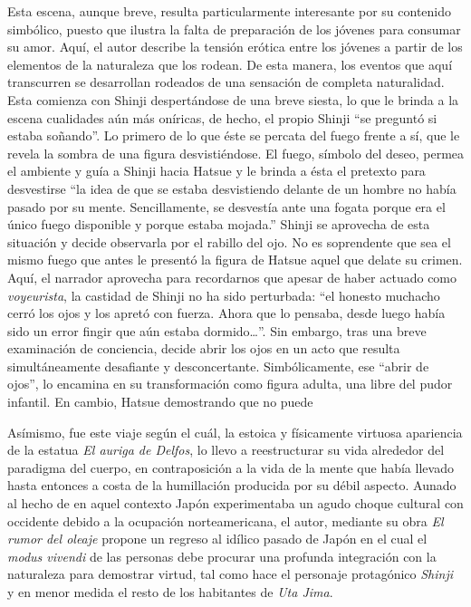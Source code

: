 Esta escena, aunque breve, resulta particularmente interesante por su contenido simbólico, puesto que ilustra la falta de preparación de los jóvenes para consumar su amor.
Aquí, el autor describe la tensión erótica entre los jóvenes a partir de los elementos de la naturaleza que los rodean.
De esta manera, los eventos que aquí transcurren se desarrollan rodeados de una sensación de completa naturalidad.
Esta comienza con Shinji despertándose de una breve siesta, lo que le brinda a la escena cualidades aún más oníricas, de hecho, el propio Shinji ``se preguntó si estaba soñando''.%
Lo primero de lo que éste se percata del fuego frente a sí, que le revela la sombra de una figura desvistiéndose. El fuego, símbolo del deseo, permea el ambiente y guía a Shinji hacia Hatsue y le brinda a ésta el pretexto para desvestirse ``la idea de que se estaba desvistiendo delante de un hombre no había pasado por su mente. Sencillamente, se desvestía ante una fogata porque era el único fuego disponible y porque estaba mojada.''%
Shinji se aprovecha de esta situación y decide observarla por el rabillo del ojo.
No es soprendente que sea el mismo fuego que antes le presentó la figura de Hatsue aquel que delate su crimen.
Aquí, el narrador aprovecha para recordarnos que apesar de haber actuado como \emph{voyeurista}, la castidad de Shinji no ha sido perturbada: ``el honesto muchacho cerró los ojos y los apretó con fuerza. Ahora que lo pensaba, desde luego había sido un error fingir que aún estaba dormido\ldots''.
Sin embargo, tras una breve examinación de conciencia, decide abrir los ojos en un acto que resulta simultáneamente desafiante y desconcertante.
Simbólicamente, ese ``abrir de ojos'', lo encamina en su transformación como figura adulta, una libre del pudor infantil.
En cambio, Hatsue demostrando que no puede

Asímismo, fue este viaje según el cuál, la estoica y físicamente virtuosa apariencia de la estatua \emph{El auriga de Delfos}, lo llevo a reestructurar su vida alrededor del paradigma del cuerpo, en contraposición a la vida de la mente que había llevado hasta entonces a costa de la humillación producida por su débil aspecto. Aunado al hecho de en aquel contexto Japón experimentaba un agudo choque cultural con occidente debido a la ocupación norteamericana, el autor, mediante su obra \emph{El rumor del oleaje} propone un regreso al idílico pasado de Japón en el cual el \emph{modus vivendi} de las personas debe procurar una profunda integración con la naturaleza para demostrar virtud, tal como hace el personaje protagónico \emph{Shinji} y en menor medida el resto de los habitantes de \emph{Uta Jima}. %

